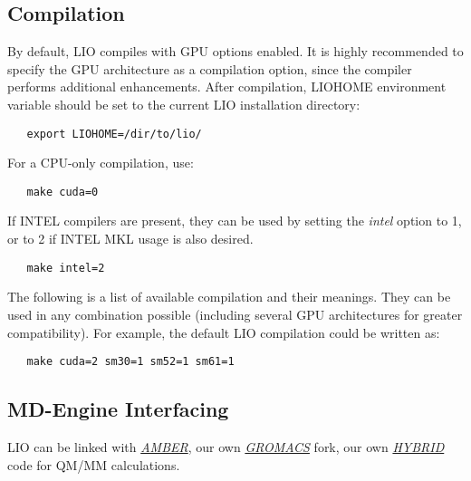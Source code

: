 \subsection{Compilation}

By default, LIO compiles with GPU options enabled. It is highly recommended to
specify the GPU architecture as a compilation option, since the compiler 
performs additional enhancements. After compilation, \textcolor{lioteal}{LIOHOME}
environment variable should be set to the current LIO installation directory:

\begin{lstlisting}
   export LIOHOME=/dir/to/lio/
\end{lstlisting}

For a CPU-only compilation, use:

\begin{lstlisting}
   make cuda=0
\end{lstlisting}

If INTEL compilers are present, they can be used by setting the \textit{intel}
option to 1, or to 2 if INTEL MKL usage is also desired. 

\begin{lstlisting}
   make intel=2
\end{lstlisting}

The following is a list of available compilation and their meanings. They can
be used in any combination possible (including several GPU architectures for
greater compatibility). For example, the default LIO compilation could be
written as:

\begin{lstlisting}
   make cuda=2 sm30=1 sm52=1 sm61=1
\end{lstlisting}



\subsection{MD-Engine Interfacing}
LIO can be linked with  \textit{\href{http://ambermd.org/index.php}{AMBER}},
our own \textit{\href{https://github.com/MALBECC/gromacs}{GROMACS}} fork, 
our own \textit{\href{https://github.com/MALBECC/hybrid}{HYBRID}} code for 
QM/MM calculations.

